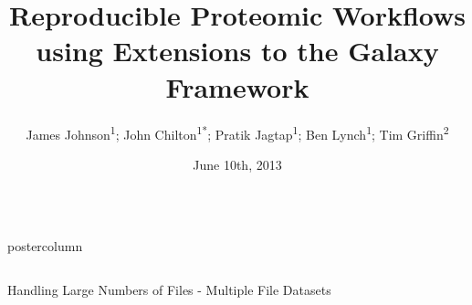 \documentclass[final,poster]{beamer}
\title{\huge Reproducible Proteomic Workflows using Extensions to the Galaxy Framework}
\author[Johnson, Chilton, et al]{James Johnson\textsuperscript{1}; John Chilton\textsuperscript{1*}; Pratik Jagtap\textsuperscript{1}; Ben Lynch\textsuperscript{1}; Tim Griffin\textsuperscript{2}}
\institute[]{\textsuperscript{1}University of Minnesota Supcomputing Institute; \textsuperscript{2}University of Minnesota }
\date{June 10th, 2013}
\newlength{\columnheight}
\newlength{\innercolheight}
\begin{document}
  \begin{frame}
    \begin{columns}
      \begin{column}{.67\textwidth}
        \begin{beamercolorbox}[center,wd=\textwidth]{postercolumn}
          \begin{minipage}[T]{.98\textwidth}  %
            \parbox[t][\columnheight]{\textwidth}{
              \begin{columns}
                \begin{column}{.39\textwidth}
                \end{column}
                \begin{column}{.01\textwidth}
                \hfill
                \end{column}
                \begin{column}{.60\textwidth}
                \end{column}      
              \end{columns}
              \vfill
              \begin{block}{Handling Large Numbers of Files - Multiple File Datasets}

\end{block}}
\end{minipage}
\end{beamercolorbox}
\end{column}
\end{columns}
\end{frame}
\end{document}
